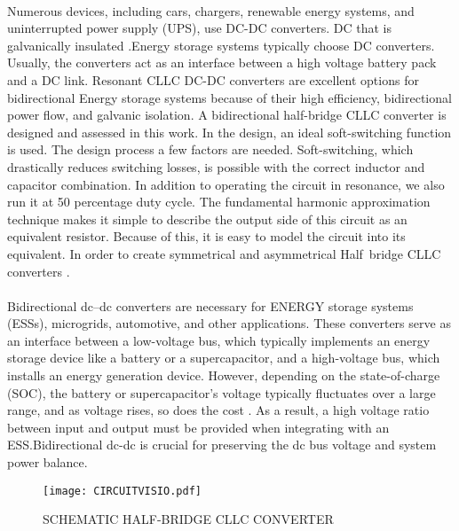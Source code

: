 \documentclass{book}
\begin{document}
	\paragraph{}
	\setcounter{page}{1}
	Numerous devices, including cars, chargers, renewable energy systems, and uninterrupted power supply (UPS), use DC-DC converters. DC that is galvanically insulated .Energy storage systems typically choose DC converters. Usually, the converters act as an interface between a high voltage battery pack and a DC link. Resonant CLLC DC-DC converters are excellent options for bidirectional Energy storage systems because of their high efficiency, bidirectional power flow, and galvanic isolation. A bidirectional half-bridge CLLC converter is designed and assessed in this work. In the design, an ideal soft-switching function is used. The design process  a few  factors are needed. Soft-switching, which drastically reduces switching losses, is possible with the correct inductor and capacitor combination. In addition to operating the circuit in resonance, we also run it at 50 percentage duty cycle. The fundamental harmonic approximation technique makes it simple to describe the output side of this circuit as an equivalent resistor. Because of this, it is easy to model the circuit into its equivalent. In order to create symmetrical and asymmetrical Half bridge CLLC converters .
\vspace{0.5cm}
	\paragraph{}
	Bidirectional dc–dc converters are necessary for ENERGY storage systems (ESSs), microgrids, automotive, and other applications. These converters serve as an interface between a low-voltage bus, which typically implements an energy storage device like a battery or a supercapacitor, and a high-voltage bus, which installs an energy generation device. However, depending on the state-of-charge (SOC), the battery or supercapacitor's voltage typically fluctuates over a large range, and as voltage rises, so does the cost . As a result, a high voltage ratio between input and output must be provided when integrating with an ESS.Bidirectional dc-dc is crucial for preserving the dc bus voltage and system power balance.
\begin{figure}[ht]
		\centering
		\texttt{[image: CIRCUITVISIO.pdf]} %
		\caption{SCHEMATIC HALF-BRIDGE CLLC CONVERTER}
	\end{figure}
\end{document}
